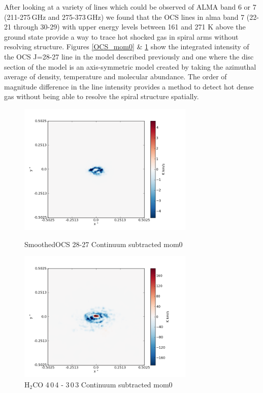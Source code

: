 \documentclass[useAMS,usenatbib]{mn2e}
\begin{document}
After looking at a variety of lines which could be observed of ALMA band 6 or 7 (211-275$\,$GHz and 275-373$\,$GHz) we found that the OCS lines in alma band 7 (22-21 through 30-29) with upper energy levels between 161 and 271 K above the ground state provide a way to trace hot shocked gas in spiral arms without resolving structure. Figures \ref{OCS_mom0} \& \ref{smoothOCS_mom0} show the integrated intensity of the OCS J=28-27 line in the model described previously and one where the disc section of the model is an axis-symmetric model created by taking the azimuthal average of density, temperature and molecular abundance. The order of magnitude difference in the line intensity provides a method to detect hot dense gas without being able to resolve the spiral structure spatially.\newline

\begin{figure}
 \includegraphics[width=84mm]{Figures/sim/imagesmoothedOCS_28-27_30deg_contSub.png}
 \label{smoothOCS_mom0}
 \caption{SmoothedOCS 28-27 Continuum subtracted mom0}
\end{figure}


 
%

\begin{figure}
 \includegraphics[width=84mm]{Figures/sim/imageH2CO_4-0-4->3-0-3_30deg_contSub.png}

 \caption{H$_2$CO 4$\,$0$\,$4 - 3$\,$0$\,$3 Continuum subtracted mom0}
\end{figure}
\end{document}
